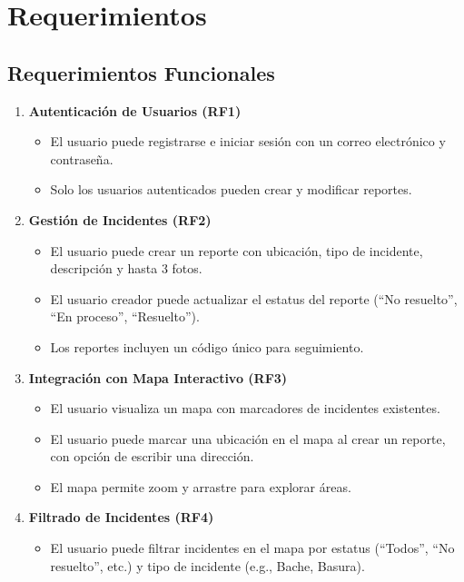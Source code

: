 \section{Requerimientos}

\subsection*{Requerimientos Funcionales}

\begin{enumerate}
    \item \textbf{Autenticación de Usuarios (RF1)}
    \begin{itemize}
        \item El usuario puede registrarse e iniciar sesión con un correo electrónico y contraseña.
        \item Solo los usuarios autenticados pueden crear y modificar reportes.
    \end{itemize}

    \item \textbf{Gestión de Incidentes (RF2)}
    \begin{itemize}
        \item El usuario puede crear un reporte con ubicación, tipo de incidente, descripción y hasta 3 fotos.
        \item El usuario creador puede actualizar el estatus del reporte (``No resuelto'', ``En proceso'', ``Resuelto'').
        \item Los reportes incluyen un código único para seguimiento.
    \end{itemize}

    \item \textbf{Integración con Mapa Interactivo (RF3)}
    \begin{itemize}
        \item El usuario visualiza un mapa con marcadores de incidentes existentes.
        \item El usuario puede marcar una ubicación en el mapa al crear un reporte, con opción de escribir una dirección.
        \item El mapa permite zoom y arrastre para explorar áreas.
    \end{itemize}

    \item \textbf{Filtrado de Incidentes (RF4)}
    \begin{itemize}
        \item El usuario puede filtrar incidentes en el mapa por estatus (``Todos'', ``No resuelto'', etc.) y tipo de incidente (e.g., Bache, Basura).
    \end{itemize}


\end{enumerate}
